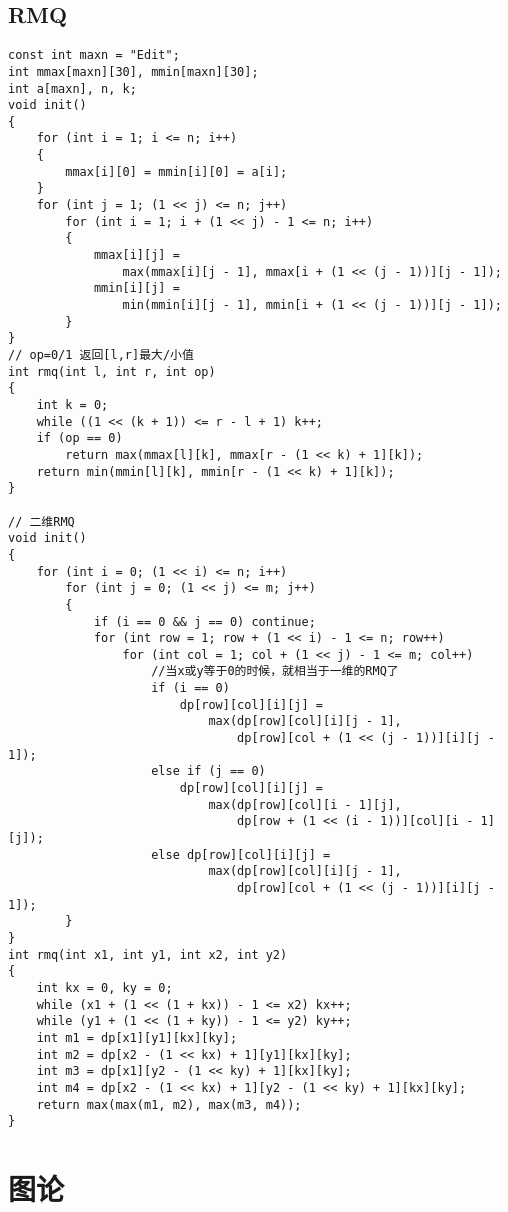 \documentclass[a4]{article}
\begin{document}
\subsection{RMQ}
\begin{lstlisting}
const int maxn = "Edit";
int mmax[maxn][30], mmin[maxn][30];
int a[maxn], n, k;
void init()
{
    for (int i = 1; i <= n; i++)
    {
        mmax[i][0] = mmin[i][0] = a[i];
    }
    for (int j = 1; (1 << j) <= n; j++)
        for (int i = 1; i + (1 << j) - 1 <= n; i++)
        {
            mmax[i][j] =
                max(mmax[i][j - 1], mmax[i + (1 << (j - 1))][j - 1]);
            mmin[i][j] =
                min(mmin[i][j - 1], mmin[i + (1 << (j - 1))][j - 1]);
        }
}
// op=0/1 返回[l,r]最大/小值
int rmq(int l, int r, int op)
{
    int k = 0;
    while ((1 << (k + 1)) <= r - l + 1) k++;
    if (op == 0)
        return max(mmax[l][k], mmax[r - (1 << k) + 1][k]);
    return min(mmin[l][k], mmin[r - (1 << k) + 1][k]);
}

// 二维RMQ
void init()
{
    for (int i = 0; (1 << i) <= n; i++)
        for (int j = 0; (1 << j) <= m; j++)
        {
            if (i == 0 && j == 0) continue;
            for (int row = 1; row + (1 << i) - 1 <= n; row++)
                for (int col = 1; col + (1 << j) - 1 <= m; col++)
                    //当x或y等于0的时候，就相当于一维的RMQ了
                    if (i == 0)
                        dp[row][col][i][j] =
                            max(dp[row][col][i][j - 1],
                                dp[row][col + (1 << (j - 1))][i][j - 1]);
                    else if (j == 0)
                        dp[row][col][i][j] =
                            max(dp[row][col][i - 1][j],
                                dp[row + (1 << (i - 1))][col][i - 1][j]);
                    else dp[row][col][i][j] =
                            max(dp[row][col][i][j - 1],
                                dp[row][col + (1 << (j - 1))][i][j - 1]);
        }
}
int rmq(int x1, int y1, int x2, int y2)
{
    int kx = 0, ky = 0;
    while (x1 + (1 << (1 + kx)) - 1 <= x2) kx++;
    while (y1 + (1 << (1 + ky)) - 1 <= y2) ky++;
    int m1 = dp[x1][y1][kx][ky];
    int m2 = dp[x2 - (1 << kx) + 1][y1][kx][ky];
    int m3 = dp[x1][y2 - (1 << ky) + 1][kx][ky];
    int m4 = dp[x2 - (1 << kx) + 1][y2 - (1 << ky) + 1][kx][ky];
    return max(max(m1, m2), max(m3, m4));
}
\end{lstlisting}
\clearpage\section{图论}
\end{document}
